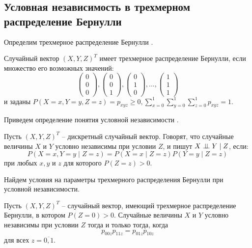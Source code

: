 \begin{centering}
    \subsection{Условная независимость в трехмерном распределение Бернулли}\label{ci_and_bernoulli}
\end{centering}
Определим трехмерное распределение Бернулли \cite{Dai2013, Teugels1990}.
\begin{definition}
    Случайный вектор $(X,Y,Z)^T$ имеет трехмерное распределение Бернулли,
    если множество его возможных значений:
    $$
        \begin{pmatrix}
            0 \\
            0 \\
            0
        \end{pmatrix},
        \begin{pmatrix}
            0 \\
            0 \\
            1
        \end{pmatrix},
        \begin{pmatrix}
            0 \\
            1 \\
            0
        \end{pmatrix}, \ldots, \begin{pmatrix}
            1 \\
            1 \\
            1
        \end{pmatrix}
    $$ и заданы $P(X=x,Y=y,Z=z)=p_{xyz} \geq 0,  \sum_{x=0}^1 \sum_{y=0}^1 \sum_{z=0}^1 p_{xyz} =1$.
\end{definition}
Приведем определение понятия условной независимости \cite{Lauritzen1996}.
\begin{definition}\label{cond_ind_def}
    Пусть $(X,Y,Z)^T$ -- дискретный случайный вектор.
    Говорят, что случайные величины $X$ и $Y$ условно независимы при условии $Z$,
    и пишут $X \perp\!\!\!\perp Y \mid Z$, если:
    $$
    P(X=x, Y=y \mid Z = z) = P(X=x \mid Z = z) P(Y=y \mid Z = z)
    $$
    при любых $x,y$ и $z$ для которого $P(Z=z)>0$.
\end{definition}
Найдем условия на параметры трехмерного распределения 
Бернулли при условной независимости.
\begin{theorem}\label{thm1}
    Пусть $(X,Y,Z)^T$ -- случайный вектор, имеющий трехмерное распределение Бернулли, в котором $P(Z=0)>0$.
    Случайные величины $X$ и $Y$ условно независимы при условии $Z$ тогда и только тогда, когда
    $$p_{00z}p_{11z}=p_{01z}p_{10z}$$ для всех $z=\overline{0,1}$.
\end{theorem}
